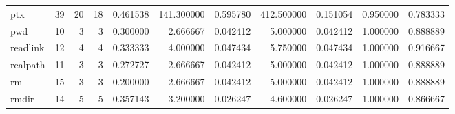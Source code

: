 \begin{longtable}{lrrrrrrrrrr}
ptx       &                                      39 &                 20 &                                18 &                                   0.461538 &                             141.300000 &                                     0.595780 &                        412.500000 &                                0.151054 &                           0.950000 &                                           0.783333 \\
pwd       &                                      10 &                  3 &                                 3 &                                   0.300000 &                               2.666667 &                                     0.042412 &                          5.000000 &                                0.042412 &                           1.000000 &                                           0.888889 \\
readlink  &                                      12 &                  4 &                                 4 &                                   0.333333 &                               4.000000 &                                     0.047434 &                          5.750000 &                                0.047434 &                           1.000000 &                                           0.916667 \\
realpath  &                                      11 &                  3 &                                 3 &                                   0.272727 &                               2.666667 &                                     0.042412 &                          5.000000 &                                0.042412 &                           1.000000 &                                           0.888889 \\
rm        &                                      15 &                  3 &                                 3 &                                   0.200000 &                               2.666667 &                                     0.042412 &                          5.000000 &                                0.042412 &                           1.000000 &                                           0.888889 \\
rmdir     &                                      14 &                  5 &                                 5 &                                   0.357143 &                               3.200000 &                                     0.026247 &                          4.600000 &                                0.026247 &                           1.000000 &                                           0.866667 \\

\end{longtable}
